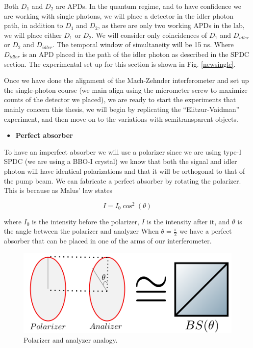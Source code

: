 \documentclass[12pt]{book}
\begin{document}
Both $D_{1}$ and $D_{2}$ are APDs. In the quantum regime, and to have confidence we are working with single photons, we will place a detector in the idler photon path, in addition to $D_{1}$ and $D_{2}$, as there are only two working APDs in the lab, we will place either $D_{1}$ or $D_{2}$. We will consider only coincidences of $D_{1}$ and $D_{idler}$ or $D_{2}$ and $D_{idler}$. The temporal window of simultaneity will be 15 ns. Where $D_{idler}$ is an APD placed in the path of the idler photon as described in the SPDC section. The experimental set up for this section is shown in Fig. \ref{newsingle}.




Once we have done the alignment of the Mach-Zehnder interferometer and set up the single-photon course (we main align using the micrometer screw to maximize counts of the detector we placed), we are ready to start the experiments that mainly concern this thesis, we will begin by replicating the ``Elitzur-Vaidman'' experiment, and then move on to the variations with semitransparent objects.


\begin{itemize}
\item {\large \textbf{Perfect absorber}}
\end{itemize}
To have an imperfect absorber we will use a polarizer since we are using type-I SPDC (we are using a BBO-I crystal) we know that both the signal and idler photon will have identical polarizations and that it will be orthogonal to that of the pump beam. We can fabricate a perfect absorber by rotating the polarizer. This is because as Malus' law states \cite{hecht}

\begin{equation}
I=I_{0} \cos^{2}(\theta)
\end{equation}

where $I_{0}$ is the intensity before the polarizer, $I$ is the intensity after it, and $\theta$ is the angle between the polarizer and analyzer When $\theta = \frac{\pi}{2}$ we have a perfect absorber that can be placed in one of the arms of our interferometer.


\begin{figure}[t!]
\centering
\includegraphics[scale=0.3]{images/polarizeranalogy.png}
\caption{Polarizer and analyzer analogy.}
\label{BS and polarizer}
\end{figure}
\end{document}

